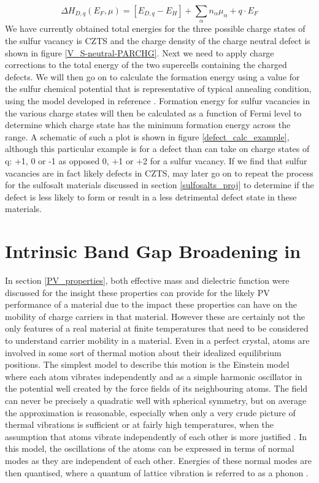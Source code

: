 \begin{equation} \label{defect_formation}
\Delta H_{D,q}(E_F, \mu) = [E_{D,q} - E_H] + \sum_\alpha n_{\alpha}\mu_{\alpha} + q \cdot E_F
\end{equation}
We have currently obtained total energies for the three possible charge states of the sulfur vacancy is CZTS and the charge density of the charge neutral defect is shown in figure \ref{V_S-neutral-PARCHG}. Next we need to apply charge corrections to the total energy of the two supercells containing the charged defects. We will then go on to calculate the formation energy using a value for the sulfur chemical potential that is representative of typical annealing condition, using the model developed in reference . 
Formation energy for sulfur vacancies in the various charge states will then be calculated as a function of Fermi level to determine which charge state has the minimum formation energy across the range. A schematic of such a plot is shown in figure \ref{defect_calc_example}, although this particular example is for a defect than can take on charge states of q: +1, 0 or -1 as opposed 0, +1 or +2 for a sulfur vacancy. If we find that sulfur vacancies are in fact likely defects in CZTS, may later go on to repeat the process for the sulfosalt materials discussed in section \ref{sulfosalts_proj} to determine if the defect is less likely to form or result in a less detrimental defect state in these materials.



\section{Intrinsic Band Gap Broadening in {\CZTS}}\label{Eg_broadening_proj}
In section \ref{PV_properties}, both effective mass and dielectric function were discussed for the insight these properties can provide for the likely PV performance of a material due to the impact these properties can have on the mobility of charge carriers in that material. However these are certainly not the only features of a real material at finite temperatures that need to be considered to understand carrier mobility in a material. 
Even in a perfect crystal, atoms are involved in some sort of thermal motion about their idealized equilibrium positions. The simplest model to describe this motion is the Einstein model where each atom vibrates independently and as a simple harmonic oscillator in the potential well created by the force fields of its neighbouring atoms. The field can never be precisely a quadratic well with spherical symmetry, but on average the approximation is reasonable, especially when only a very crude picture of thermal vibrations is sufficient or at fairly high temperatures, when the assumption that atoms vibrate independently of each other is more justified \cite{Ziman_solids}. In this model, the oscillations of the atoms can be expressed in terms of normal modes as they are independent of each other. Energies of these normal modes are then quantised, where a quantum of lattice vibration is referred to as a phonon \cite{fund_semi}.

